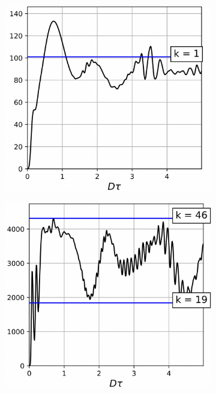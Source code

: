 \begin{figure}[H]
  \centering
  \begin{subfigure}[t]{0.3\textwidth}
    \centering
    \includegraphics[width=\textwidth]{figures/result-nanopore-do-m2-by-time-beta1.png}
    \caption{\protect}
    \label{fig:result-nanopore-do-m2-by-time-beta1}
  \end{subfigure}
  \hfill
  \begin{subfigure}[t]{0.3\textwidth}
    \centering
    \includegraphics[width=\textwidth]{figures/result-nanopore-do-m2-by-time-beta2.png}

\end{subfigure}
\end{figure}
